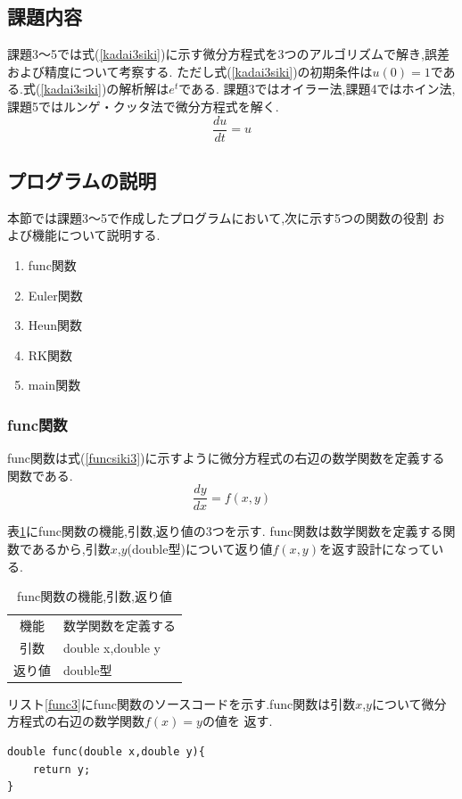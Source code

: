 \documentclass[dvipdfmx]{jarticle}
\begin{document}
    \subsection{課題内容}
    課題3～5では式(\ref{kadai3siki})に示す微分方程式を3つのアルゴリズムで解き,誤差および精度について考察する.
    ただし式(\ref{kadai3siki})の初期条件は$u(0)=1$である.式(\ref{kadai3siki})の解析解は$e^t$である.
    課題3ではオイラー法,課題4ではホイン法,課題5ではルンゲ・クッタ法で微分方程式を解く.
      \begin{equation}
      \frac{du}{dt} = u
          \label{kadai3siki}
        \end{equation}

    \subsection{プログラムの説明}
    本節では課題3～5で作成したプログラムにおいて,次に示す5つの関数の役割
    および機能について説明する.
    \begin{enumerate}
      \item func関数
      \item Euler関数
      \item Heun関数
      \item RK関数
      \item main関数
      \end{enumerate}

      \subsubsection{func関数}
      func関数は式(\ref{funcsiki3})に示すように微分方程式の右辺の数学関数を定義する関数である.
      \begin{equation}
        \frac{dy}{dx} = f(x,y)
            \label{funcsiki3}
          \end{equation}

      表\ref{func3table}にfunc関数の機能,引数,返り値の3つを示す.
    func関数は数学関数を定義する関数であるから,引数$x$,$y$(double型)について返り値$f(x,y)$を返す設計になっている.

      \begin{table}[H]
      \caption{func関数の機能,引数,返り値}
      \label{func3table}
      \begin{center}
          \begin{tabular}{c|l}\hline
        機能 & 数学関数を定義する\\
        引数 & double x,double y \\
        返り値 & double型 \\ \hline
          \end{tabular}
      \end{center}
      \end{table}
      リスト\ref{func3}にfunc関数のソースコードを示す.func関数は引数$x$,$y$について微分方程式の右辺の数学関数$f(x) = y$の値を
      返す.
      \begin{lstlisting}[basicstyle=\ttfamily\footnotesize, frame=single,label=func3,caption=func関数]
double func(double x,double y){
    return y;
}
      \end{lstlisting}
      
\end{document}
